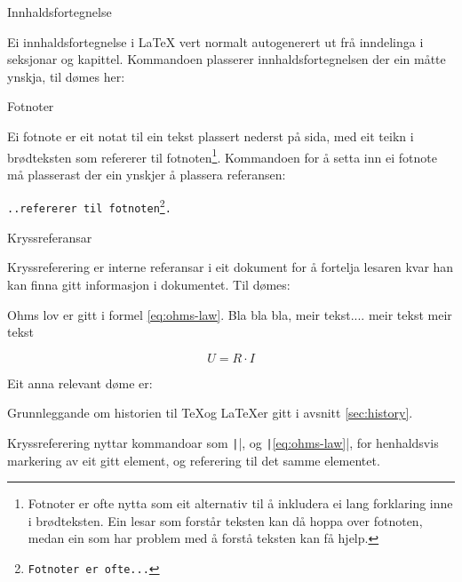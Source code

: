 	\begin{frame}{Innhaldsfortegnelse}
	
	Ei innhaldsfortegnelse i \LaTeX{} vert normalt autogenerert ut frå inndelinga i seksjonar og kapittel. Kommandoen \texttt{\tableofcontents} plasserer innhaldsfortegnelsen der ein måtte ynskja, til dømes her:\\
	
	\tableofcontents
\end{frame}

\begin{frame}{Fotnoter}
	
	Ei fotnote er eit notat til ein tekst plassert nederst på sida, med eit teikn i brødteksten som refererer til fotnoten\footnote{Fotnoter er ofte nytta som eit alternativ til å inkludera ei lang forklaring inne i brødteksten. Ein lesar som forstår teksten kan då hoppa over fotnoten, medan ein som har problem med å forstå teksten kan få hjelp.}. Kommandoen for å setta inn ei fotnote må plasserast der ein ynskjer å plassera referansen:
	
	\texttt{..refererer til fotnoten\footnote{Fotnoter er ofte...}.}
	
\end{frame}

\begin{frame}{Kryssreferansar}
	
	Kryssreferering er interne referansar i eit dokument for å fortelja lesaren kvar han kan finna gitt informasjon i dokumentet. Til dømes:
	
	\begin{displayquote}
		Ohms lov er gitt i formel \eqref{eq:ohms-law}. Bla bla bla, meir tekst.... meir tekst meir tekst
		
		\begin{equation}
			U = R \cdot I
			\label{eq:ohms-law}
		\end{equation}
		
	\end{displayquote}
	
	Eit anna relevant døme er:
	
	\begin{displayquote}
		Grunnleggande om historien til \TeX og \LaTeX er gitt i avsnitt \ref{sec:history}.
	\end{displayquote}
	
	Kryssreferering nyttar kommandoar som \texttt|\label{eq:ohms-law}|, og \texttt|\eqref{eq:ohms-law}|, for henhaldsvis markering av eit gitt element, og referering til det samme elementet.

	
\end{frame}



